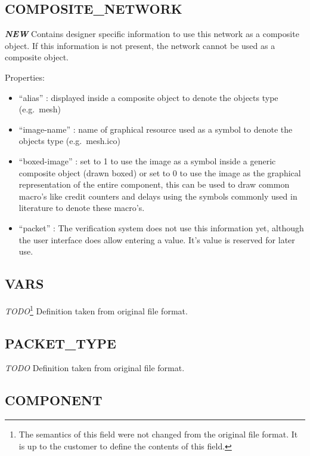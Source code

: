 \subsection{COMPOSITE\_NETWORK}\label{compositeux5fnetwork}

\textbf{\emph{NEW}} Contains designer specific information to use this
network as a composite object. If this information is not present, the
network cannot be used as a composite object.

Properties:

\begin{itemize}
\itemsep1pt\parskip0pt
\item
  ``alias'' : displayed inside a composite object to denote the objects
  type (e.g.~mesh)
\item
  ``image-name'' : name of graphical resource used as a symbol to denote
  the objects type (e.g.~mesh.ico)
\item
  ``boxed-image'' : set to 1 to use the image as a symbol inside a
  generic composite object (drawn boxed) or set to 0 to use the image as
  the graphical representation of the entire component, this can be used
  to draw common macro's like credit counters and delays using the
  symbols commonly used in literature to denote these macro's.
\item
  ``packet'' : The verification system does not use this information yet, 
  				although the user interface does allow entering a value.
  				It's value is reserved for later use.
\end{itemize}

\subsection{VARS}\label{vars}

\emph{TODO}\footnote{\label{fileformat-todo}The semantics of this field 
were not changed from the original file format.
It is up to the customer to define the contents of this field.}
Definition taken from original file format.

\subsection{PACKET\_TYPE}\label{packetux5ftype}

\emph{TODO}
Definition taken from original file format.

\subsection{COMPONENT}\label{component}


